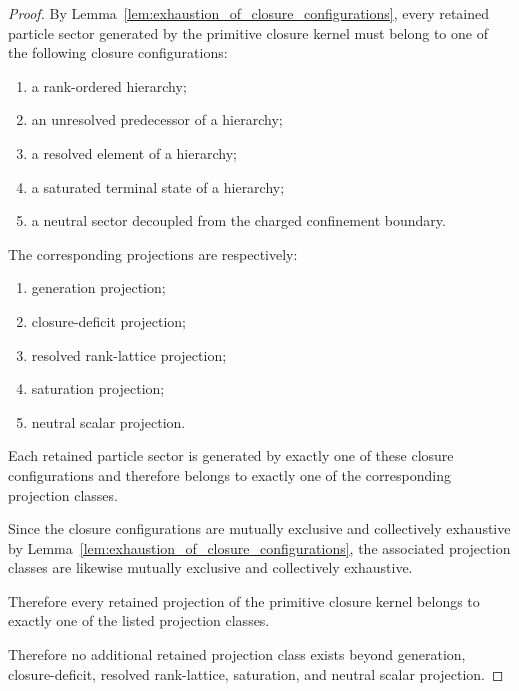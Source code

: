 \documentclass[11pt]{article}
\theoremstyle{definition}
\theoremstyle{remark}
\begin{document}
\begin{proof}

By Lemma~\ref{lem:exhaustion_of_closure_configurations},
every retained particle sector generated by the primitive
closure kernel must belong to one of the following closure
configurations:

\begin{enumerate}

\item a rank-ordered hierarchy;

\item an unresolved predecessor of a hierarchy;

\item a resolved element of a hierarchy;

\item a saturated terminal state of a hierarchy;

\item a neutral sector decoupled from the charged confinement
boundary.

\end{enumerate}

The corresponding projections are respectively:

\begin{enumerate}

\item generation projection;

\item closure-deficit projection;

\item resolved rank-lattice projection;

\item saturation projection;

\item neutral scalar projection.

\end{enumerate}

Each retained particle sector is generated by exactly one of
these closure configurations and therefore belongs to exactly
one of the corresponding projection classes.

Since the closure configurations are mutually exclusive and
collectively exhaustive by
Lemma~\ref{lem:exhaustion_of_closure_configurations},
the associated projection classes are likewise mutually
exclusive and collectively exhaustive.

Therefore every retained projection of the primitive closure
kernel belongs to exactly one of the listed projection classes.

Therefore no additional retained projection class exists beyond
generation, closure-deficit, resolved rank-lattice, saturation,
and neutral scalar projection.

\end{proof}
\end{document}
